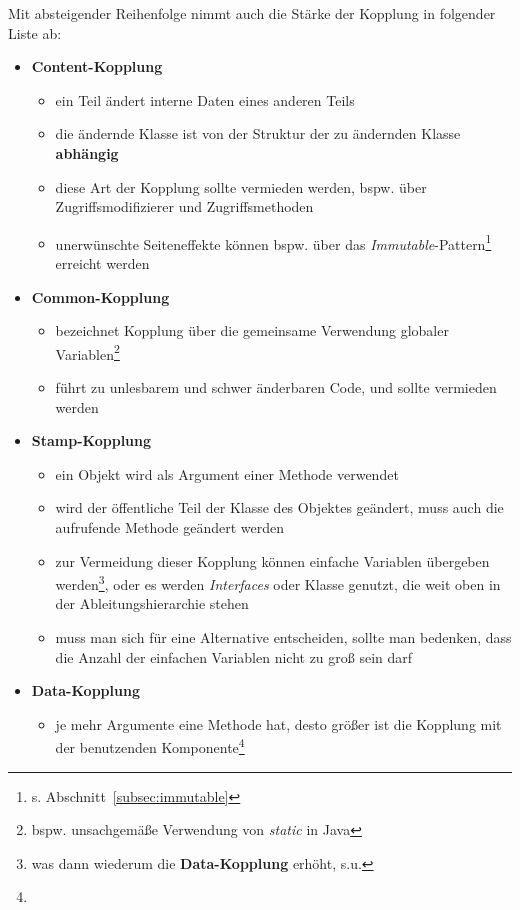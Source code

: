 \noindent
Mit absteigender Reihenfolge nimmt auch die Stärke der Kopplung in folgender Liste ab:


\begin{itemize}
    \item \textbf{Content-Kopplung}
    \begin{itemize}
    \item ein Teil ändert interne Daten eines anderen Teils
    \item die ändernde Klasse ist von der Struktur der zu ändernden Klasse \textbf{abhängig}
    \item diese Art der Kopplung sollte vermieden werden, bspw. über Zugriffsmodifizierer und Zugriffsmethoden
    \item unerwünschte Seiteneffekte können bspw. über das \textit{Immutable}-Pattern\footnote{
    s. Abschnitt~\ref{subsec:immutable}
    } erreicht werden
    \end{itemize}
    \item \textbf{Common-Kopplung}
    \begin{itemize}
    \item bezeichnet Kopplung über die gemeinsame Verwendung globaler Variablen\footnote{
        bspw. unsachgemäße Verwendung von \textit{static} in Java
    }
    \item führt zu unlesbarem und schwer änderbaren Code, und sollte vermieden werden
    \end{itemize}
    \item \textbf{Stamp-Kopplung}
    \begin{itemize}
    \item ein Objekt wird als Argument einer Methode verwendet
    \item wird der öffentliche Teil der Klasse des Objektes geändert, muss auch die aufrufende Methode geändert werden
    \item zur Vermeidung dieser Kopplung können einfache Variablen übergeben werden\footnote{
        was dann wiederum die \textbf{Data-Kopplung} erhöht, s.u.
    }, oder es werden \textit{Interfaces} oder Klasse genutzt, die weit oben in der Ableitungshierarchie stehen
    \item muss man sich für eine Alternative entscheiden, sollte man bedenken, dass die Anzahl der einfachen Variablen nicht zu groß sein darf
    \end{itemize}
    \item \textbf{Data-Kopplung}
    \begin{itemize}
    \item je mehr Argumente eine Methode hat, desto größer ist die Kopplung mit der benutzenden Komponente\footnote{
}
\end{itemize}
\end{itemize}
